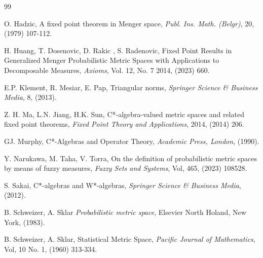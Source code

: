\documentclass{amsart}%
\theoremstyle{plain}
\numberwithin{equation}{section}
\begin{document}
\begin{thebibliography}{99}                                                                                               %

	 {O. Hadzic, A fixed point theorem in Menger space, {\em Publ. Ins. Math. (Belgr)},  20, (1979) 107-112.}

 {H. Huang, T. Dosenovic, D. Rakic , S. Radenovic,
	Fixed Point Results in Generalized Menger Probabilistic Metric Spaces with Applications to Decomposable Measures,
	{\em Axioms}, Vol. 12, No. 7 2014, (2023) 660.}

 {E.P. Klement, R. Mesiar, E. Pap,
	Triangular norms,
	{\em Springer Science \& Business Media}, 8, (2013).}


 {Z. H. Ma, L.N. Jiang, H.K. Sun,
	C*-algebra-valued metric spaces and related fixed point theorems,
	{\em Fixed Point Theory and
		Applications},  2014, (2014) 206.}

 { GJ. Murphy, C*-Algebras and Operator Theory,
	{\em  Academic Press, London}, (1990).}	

 {Y. Narukawa, M. Taha, V. Torra,
	On the definition of probabilistic metric spaces by means of fuzzy measures,
	{\em Fuzzy Sets and Systems},   Vol, 465, (2023) 108528.}

 {S. Sakai,
	C*-algebras and W*-algebras,
	{\em Springer Science \& Business Media}, (2012).}

 B. Schweizer, A. Sklar \emph{Probabilistic metric space}, Elsevier North Holand, New York, (1983).	

 {B. Schweizer, A. Sklar,
	Statistical Metric Space,
	{\em Pacific Journal of Mathematics},   Vol, 10 No. 1, (1960) 313-334.}
\end{thebibliography}
\end{document}
